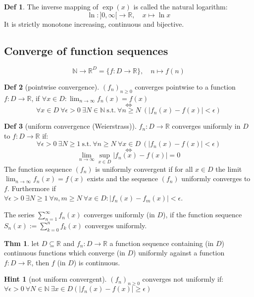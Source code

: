 \documentclass[a4paper, 10pt]{article}
\theoremstyle{definition}
\newtheorem*{theorem}{Thm}
\newtheorem*{definition}{Def}
\newtheorem*{note_wrapper}{Hint}
\theoremstyle{named}
\newenvironment{note}%
    {\begin{mdframed}[style=trick]\begin{note_wrapper}}%
    {\end{note_wrapper}\end{mdframed}}
\newcommand{\R}{\mathbb{R}}
\newcommand{\N}{\mathbb{N}}
\begin{document}
\begin{definition}
    The inverse mapping of $\exp (x)$ is called the natural logarithm: 
    $$\ln : ]0, \infty [ \to \R, \quad x \mapsto \ln x$$
    It is strictly monotone increasing, continuous and bijective.
\end{definition}

\subsection{Converge of function sequences}
$$\N \to \R^D = \{f: D \to \R\}, \quad n \mapsto f(n)$$
\begin{definition} [pointwise convergence]
    $(f_n)_{n \geq 0}$ converges pointwise to a function $f: D \to \R$, if $\forall x \in D : \lim_{n \to \infty} f_n(x) = f(x)$
    $$\iff$$
    $$\forall x \in D \ \forall \epsilon > 0 \ \exists N \in \N \ \text{s.t.} \ \forall n \geq N \ (|f_n(x) - f(x)| < \epsilon)$$
\end{definition}

\begin{definition}[uniform convergence (Weierstrass)]
    $f_n: D \to \R$ converges uniformly in $D$ to $f: D \to \R$ if: 
    $$\forall \epsilon > 0 \ \exists N \geq 1 \ \text{s.t.} \ \forall n \geq N \ \forall x \in D \ (|f_n(x) - f(x)| < \epsilon)$$
    $$\iff$$
    $$\lim_{n\to\infty} \sup_{x \in D} |f_n(x) - f(x)| = 0$$
    The function sequence $(f_n)$ is uniformly convergent if for all
    $x \in D$ the limit $\lim_{n\to\infty} f_n(x) = f(x)$ exists and the sequence $(f_n)$ uniformly converges to $f$. Furthermore if \\
    $\forall \epsilon > 0 \ \exists N \geq 1 \ \forall n, m \geq N \ \forall x \in D: |f_n(x) - f_m(x)| < \epsilon$.

    The series $\sum_{n = 1}^\infty f_n(x)$ converges uniformly (in $D$), if the function sequence $S_n(x) := \sum_{k=0}^n f_k(x)$ converges uniformly.
\end{definition}

\begin{theorem}
    let $D \subseteq \R$ and $f_n: D \to \R$ a function sequence containing (in $D$) continuous functions which converge (in $D$) uniformly against a function $f: D \to \R$, then $f$ (in $D$) is continuous.
\end{theorem}

\begin{note}[not uniform convergent] $(f_n)_{n \geq 0}$ converges not uniformly if:
    $\forall \epsilon > 0 \ \forall N \in \N \ \exists x \in D (|f_n(x) - f(x)| \geq \epsilon)$
\end{note}
\end{document}
